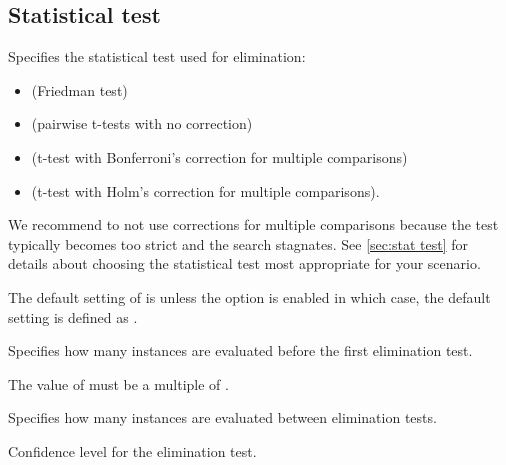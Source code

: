 \subsection[Statistical test]{Statistical test}
\begin{description}
Specifies the statistical test used for elimination:
\begin{itemize}
\item[]  (Friedman test)
\item[]  (pairwise t-tests with no correction)
\item[]  (t-test with Bonferroni's correction for multiple comparisons)
\item[]  (t-test with Holm's correction for multiple comparisons).
\end{itemize}
 We recommend to not use corrections for multiple comparisons because the test typically becomes too strict and the search stagnates. 
See \autoref{sec:stat test} for details about choosing the statistical test most appropriate for your scenario.
\begin{xwarningbox}
 The default setting of  is  unless the  option is enabled in which case, the default  setting is defined as .
\end{xwarningbox}

 Specifies how many instances are evaluated before the first elimination test.
\begin{xwarningbox}
The value of  must be a multiple of .
\end{xwarningbox}

Specifies how many instances are evaluated between elimination tests.

Confidence level for the elimination test.

\end{description}

